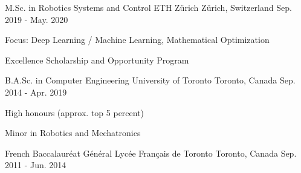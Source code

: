 

\begin{cventries}

  \cventry
    {M.Sc. in Robotics Systems and Control} %
    {ETH Z\"urich} %
    {Z\"urich, Switzerland} %
    {Sep. 2019 - May. 2020} %
    {
      \begin{cvitems} %
        \item Focus: Deep Learning / Machine Learning, Mathematical Optimization
        \item Excellence Scholarship and Opportunity Program
      \end{cvitems}
    }

  \cventry
    {B.A.Sc. in Computer Engineering} %
    {University of Toronto} %
    {Toronto, Canada} %
    {Sep. 2014 - Apr. 2019} %
    {
      \begin{cvitems} %
        \item High honours (approx. top 5 percent)
        \item Minor in Robotics and Mechatronics
      \end{cvitems}
    }

  \cventry
      {French Baccalauréat Général}
      {Lycée Français de Toronto}
      {Toronto, Canada}
      {Sep. 2011 - Jun. 2014}
      {}

\end{cventries}
